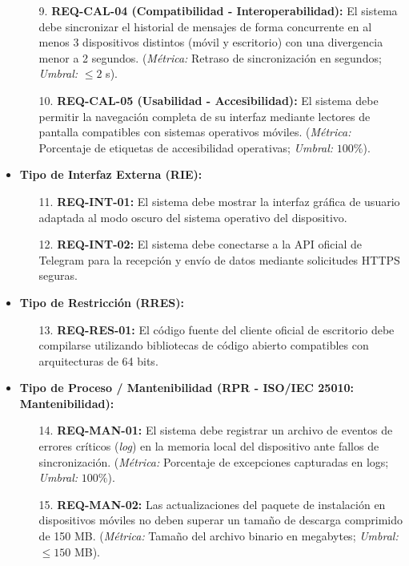 \documentclass[11pt,a4paper]{article}
\begin{document}
\begin{itemize}
\begin{enumerate}
        \item[9.] \textbf{REQ-CAL-04 (Compatibilidad - Interoperabilidad):} El sistema debe sincronizar el historial de mensajes de forma concurrente en al menos 3 dispositivos distintos (móvil y escritorio) con una divergencia menor a 2 segundos. (\textit{Métrica:} Retraso de sincronización en segundos; \textit{Umbral:} $\le 2$ s).
        \item[10.] \textbf{REQ-CAL-05 (Usabilidad - Accesibilidad):} El sistema debe permitir la navegación completa de su interfaz mediante lectores de pantalla compatibles con sistemas operativos móviles. (\textit{Métrica:} Porcentaje de etiquetas de accesibilidad operativas; \textit{Umbral:} $100\%$).
    \end{enumerate}
    \item \textbf{Tipo de Interfaz Externa (RIE):}
    \begin{enumerate}
        \item[11.] \textbf{REQ-INT-01:} El sistema debe mostrar la interfaz gráfica de usuario adaptada al modo oscuro del sistema operativo del dispositivo.
        \item[12.] \textbf{REQ-INT-02:} El sistema debe conectarse a la API oficial de Telegram para la recepción y envío de datos mediante solicitudes HTTPS seguras.
    \end{enumerate}
    \item \textbf{Tipo de Restricción (RRES):}
    \begin{enumerate}
        \item[13.] \textbf{REQ-RES-01:} El código fuente del cliente oficial de escritorio debe compilarse utilizando bibliotecas de código abierto compatibles con arquitecturas de 64 bits.
    \end{enumerate}
    \item \textbf{Tipo de Proceso / Mantenibilidad (RPR - ISO/IEC 25010: Mantenibilidad):}
    \begin{enumerate}
        \item[14.] \textbf{REQ-MAN-01:} El sistema debe registrar un archivo de eventos de errores críticos (\textit{log}) en la memoria local del dispositivo ante fallos de sincronización. (\textit{Métrica:} Porcentaje de excepciones capturadas en logs; \textit{Umbral:} $100\%$).
        \item[15.] \textbf{REQ-MAN-02:} Las actualizaciones del paquete de instalación en dispositivos móviles no deben superar un tamaño de descarga comprimido de 150 MB. (\textit{Métrica:} Tamaño del archivo binario en megabytes; \textit{Umbral:} $\le 150$ MB).
    \end{enumerate}
\end{itemize}
\end{document}
